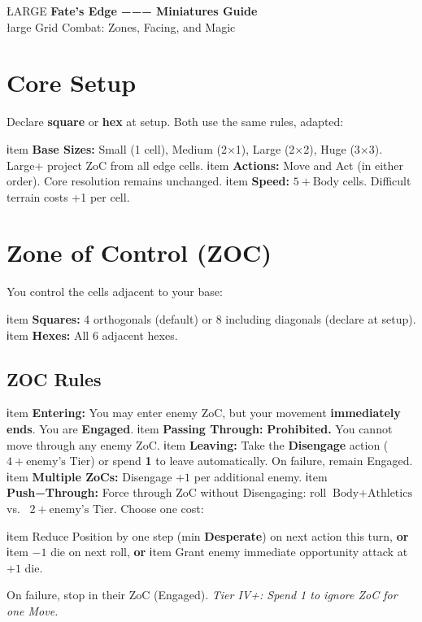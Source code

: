\documentclass[11pt]{article}
\begin{document}
\begin{center}
{ŁARGE \textbf{Fate's Edge −−− Miniatures Guide}}\\[4pt]
{łarge Grid Combat: Zones, Facing, and Magic}
\end{center}

\section{Core Setup}
Declare \textbf{square} or \textbf{hex} at setup. Both use the same rules, adapted:
\begin{itemize}
  ℹtem \textbf{Base Sizes:} Small (1 cell), Medium (2×1), Large (2×2), Huge (3×3). Large+ project ZoC from all edge cells.
  ℹtem \textbf{Actions:} Move and Act (in either order). Core resolution remains unchanged.
  ℹtem \textbf{Speed:} $5 + \text{Body}$ cells. Difficult terrain costs +1 per cell.
\end{itemize}

\section{Zone of Control (ZOC)}
You control the cells adjacent to your base:
\begin{itemize}
  ℹtem \textbf{Squares:} 4 orthogonals (default) or 8 including diagonals (declare at setup).
  ℹtem \textbf{Hexes:} All 6 adjacent hexes.
\end{itemize}

\subsection{ZOC Rules}
\begin{itemize}
  ℹtem \textbf{Entering:} You may enter enemy ZoC, but your movement \textbf{immediately ends}. You are \textbf{Engaged}.
  ℹtem \textbf{Passing Through:} \textbf{Prohibited.} You cannot move through any enemy ZoC.
  ℹtem \textbf{Leaving:} Take the \textbf{Disengage} action (\DV{} $4 + \text{enemy's Tier}$) or spend \textbf{1 \Boon} to leave automatically. On failure, remain Engaged.
  ℹtem \textbf{Multiple ZoCs:} Disengage \DV{} $+1$ per additional enemy.
  ℹtem \textbf{Push−Through:} Force through ZoC without Disengaging: roll $\text{Body} + \text{Athletics}$ vs.\ \DV{} $2 + \text{enemy's Tier}$. Choose one cost:
    \begin{itemize}
      ℹtem Reduce Position by one step (min \textbf{Desperate}) on next action this turn, \textbf{or}
      ℹtem $−1$ die on next roll, \textbf{or}
      ℹtem Grant enemy immediate opportunity attack at $+1$ die.
    \end{itemize}
    On failure, stop in their ZoC (Engaged). \textit{Tier IV+: Spend 1 \Boon{} to ignore ZoC for one Move.}
\end{itemize}
\end{document}
